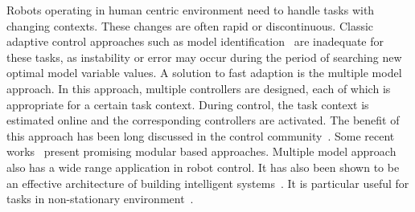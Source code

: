 Robots operating in human centric environment need to handle tasks with changing contexts. These changes are often rapid or discontinuous. Classic adaptive control approaches such as model identification~\cite{khalil2004modeling} are inadequate for these tasks, as instability or error may occur during the period of searching new optimal model variable values. A solution to fast adaption is the multiple model approach. In this approach, multiple controllers are designed, each of which is appropriate for a certain task context. During control, the task context is estimated online and the corresponding controllers are activated. The benefit of this approach has been long discussed in the control community~\cite{jacobs1991adaptive,narendra1995adaptation,narendra1997adaptive}. Some recent works~\cite{fekri2007robust,kuipers2010multiple} present promising modular based approaches. Multiple model approach also has a wide range application in robot control. It has also been shown to be an effective architecture of building intelligent systems~\cite{bryson2004modular,BrysonMcG12}. It is particular useful for tasks in  non-stationary environment~\cite{petkos2006learning,sugimoto2012emosaic}.



